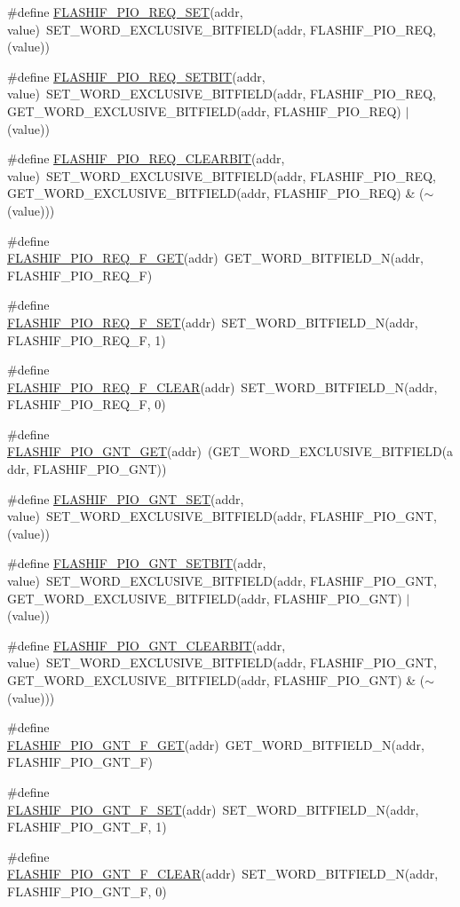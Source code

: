 \begin{DoxyCompactItemize}
\item 
\#define \hyperlink{a00551_a6681d5e0b8a113bcbf260b4f3bd123e4}{FLASHIF\_\-PIO\_\-REQ\_\-SET}(addr, value)~SET\_\-WORD\_\-EXCLUSIVE\_\-BITFIELD(addr, FLASHIF\_\-PIO\_\-REQ, (value))
\item 
\#define \hyperlink{a00551_af5dd034dec7754105a46a0fa349a7efa}{FLASHIF\_\-PIO\_\-REQ\_\-SETBIT}(addr, value)~SET\_\-WORD\_\-EXCLUSIVE\_\-BITFIELD(addr, FLASHIF\_\-PIO\_\-REQ, GET\_\-WORD\_\-EXCLUSIVE\_\-BITFIELD(addr, FLASHIF\_\-PIO\_\-REQ) $|$ (value))
\item 
\#define \hyperlink{a00551_a6678c186ed4ae48897e702217fd10c70}{FLASHIF\_\-PIO\_\-REQ\_\-CLEARBIT}(addr, value)~SET\_\-WORD\_\-EXCLUSIVE\_\-BITFIELD(addr, FLASHIF\_\-PIO\_\-REQ, GET\_\-WORD\_\-EXCLUSIVE\_\-BITFIELD(addr, FLASHIF\_\-PIO\_\-REQ) \& ($\sim$(value)))
\item 
\#define \hyperlink{a00551_a6dace6de4fe38dad9e381fa4d86c301b}{FLASHIF\_\-PIO\_\-REQ\_\-F\_\-GET}(addr)~GET\_\-WORD\_\-BITFIELD\_\-N(addr, FLASHIF\_\-PIO\_\-REQ\_\-F)
\item 
\#define \hyperlink{a00551_aa1698e62535cbec2ca3d70161ebbc8ae}{FLASHIF\_\-PIO\_\-REQ\_\-F\_\-SET}(addr)~SET\_\-WORD\_\-BITFIELD\_\-N(addr, FLASHIF\_\-PIO\_\-REQ\_\-F, 1)
\item 
\#define \hyperlink{a00551_a0f27af19a937a0788932c61c008c253b}{FLASHIF\_\-PIO\_\-REQ\_\-F\_\-CLEAR}(addr)~SET\_\-WORD\_\-BITFIELD\_\-N(addr, FLASHIF\_\-PIO\_\-REQ\_\-F, 0)
\item 
\#define \hyperlink{a00551_a531e363321e73934248f67c7b6722958}{FLASHIF\_\-PIO\_\-GNT\_\-GET}(addr)~(GET\_\-WORD\_\-EXCLUSIVE\_\-BITFIELD(addr, FLASHIF\_\-PIO\_\-GNT))
\item 
\#define \hyperlink{a00551_a4add76436ea1aec75c27ea6f34742e37}{FLASHIF\_\-PIO\_\-GNT\_\-SET}(addr, value)~SET\_\-WORD\_\-EXCLUSIVE\_\-BITFIELD(addr, FLASHIF\_\-PIO\_\-GNT, (value))
\item 
\#define \hyperlink{a00551_a2b46449191e03342c7ee68ec46eb2dba}{FLASHIF\_\-PIO\_\-GNT\_\-SETBIT}(addr, value)~SET\_\-WORD\_\-EXCLUSIVE\_\-BITFIELD(addr, FLASHIF\_\-PIO\_\-GNT, GET\_\-WORD\_\-EXCLUSIVE\_\-BITFIELD(addr, FLASHIF\_\-PIO\_\-GNT) $|$ (value))
\item 
\#define \hyperlink{a00551_a94dd52c5e4c22e7be4e7780a585426c5}{FLASHIF\_\-PIO\_\-GNT\_\-CLEARBIT}(addr, value)~SET\_\-WORD\_\-EXCLUSIVE\_\-BITFIELD(addr, FLASHIF\_\-PIO\_\-GNT, GET\_\-WORD\_\-EXCLUSIVE\_\-BITFIELD(addr, FLASHIF\_\-PIO\_\-GNT) \& ($\sim$(value)))
\item 
\#define \hyperlink{a00551_a703eab65536867ceb7abafbc5ca386a4}{FLASHIF\_\-PIO\_\-GNT\_\-F\_\-GET}(addr)~GET\_\-WORD\_\-BITFIELD\_\-N(addr, FLASHIF\_\-PIO\_\-GNT\_\-F)
\item 
\#define \hyperlink{a00551_a4772ce1e3f6ff3fa3bc7b6d92ed449c9}{FLASHIF\_\-PIO\_\-GNT\_\-F\_\-SET}(addr)~SET\_\-WORD\_\-BITFIELD\_\-N(addr, FLASHIF\_\-PIO\_\-GNT\_\-F, 1)
\item 
\#define \hyperlink{a00551_a93d453ce04d42b142dc69c0dafa8c591}{FLASHIF\_\-PIO\_\-GNT\_\-F\_\-CLEAR}(addr)~SET\_\-WORD\_\-BITFIELD\_\-N(addr, FLASHIF\_\-PIO\_\-GNT\_\-F, 0)
\end{DoxyCompactItemize}


